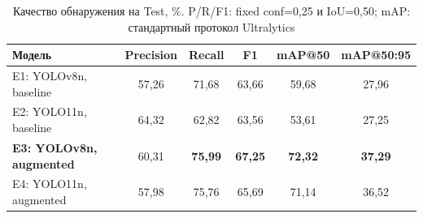 \begin{table}[t]
\caption{Качество обнаружения на Test, \%. P/R/F1: fixed conf=0,25 и IoU=0,50; mAP: стандартный протокол Ultralytics}
\label{tab:test_metrics}
\centering
\small
\begin{tabular*}{0.91\textwidth}{@{\extracolsep{\fill}}lccccc@{}}
\toprule
Модель & Precision & Recall & F1 & mAP@50 & mAP@50:95 \\
\midrule
E1: YOLOv8n, baseline & 57,26 & 71,68 & 63,66 & 59,68 & 27,96 \\
E2: YOLO11n, baseline & 64,32 & 62,82 & 63,56 & 53,61 & 27,25 \\
\textbf{E3: YOLOv8n, augmented} & 60,31 & \textbf{75,99} & \textbf{67,25} & \textbf{72,32} & \textbf{37,29} \\
E4: YOLO11n, augmented & 57,98 & 75,76 & 65,69 & 71,14 & 36,52 \\
\bottomrule
\end{tabular*}
\end{table}
